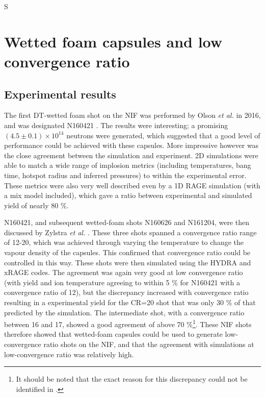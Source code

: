 S%

\section{Wetted foam capsules and low convergence ratio}

\subsection{Experimental results}

The first DT-wetted foam shot on the NIF was performed by Olson \textit{et al.} in 2016, and was designated N160421 \cite{Olson2016}. The results were interesting; a promising $(4.5 \pm 0.1) \times 10^{14}$ neutrons were generated, which suggested that a good level of performance could be achieved with these capsules. More impressive however was the close agreement between the simulation and experiment. 2D simulations were able to match a wide range of implosion metrics (including temperatures, bang time, hotspot radius and inferred pressures) to within the experimental error. These metrics were also very well described even by a 1D RAGE simulation (with a mix model included), which gave a ratio between experimental and simulated yield of nearly 80 \%. 

N160421, and subsequent wetted-foam shots N160626 and N161204, were then discussed by Zylstra \textit{et al.} \cite{Zylstra2018}. These three shots spanned a convergence ratio range of 12-20, which was achieved through varying the temperature to change the vapour density of the capsules. This confirmed that convergence ratio could be controlled in this way. These shots were then simulated using the HYDRA and xRAGE codes. The agreement was again very good at low convergence ratio (with yield and ion temperature agreeing to within 5 \% for N160421 with a convergence ratio of 12), but the discrepancy increased with convergence ratio resulting in a experimental yield for the CR=20 shot that was only 30 \% of that predicted by the simulation. The intermediate shot, with a convergence ratio between 16 and 17, showed a good agreement of above 70 \%\footnote{It should be noted that the exact reason for this discrepancy could not be identified in \cite{Zylstra2018}.}. These NIF shots therefore showed that wetted-foam capsules could be used to generate low-convergence ratio shots on the NIF, and that the agreement with simulations at low-convergence ratio was relatively high.

